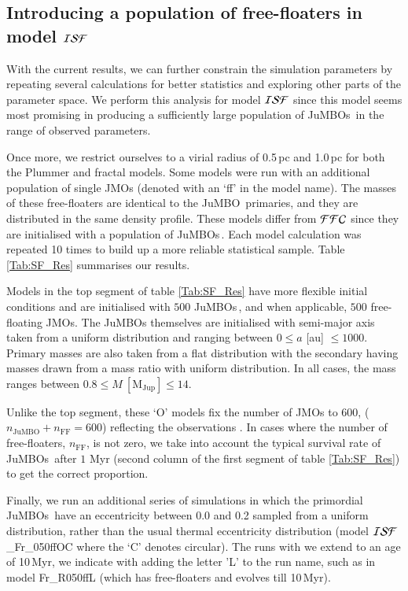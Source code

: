 \documentclass[submission,phys]{lib/SciPost}
\newcommand{\jumbo}{\mbox{JuMBO}}
\newcommand{\jumbos}{\mbox{JuMBOs}}
\begin{document}
\subsection{Introducing a population of free-floaters in model ${\cal ISF}$}\label{sect:ISF_explored}

With the current results, we can further constrain the simulation
parameters by repeating several calculations for better statistics and
exploring other parts of the parameter space.  We perform this
analysis for model ${\cal ISF}$ since this model seems most
promising in producing a sufficiently large population of \jumbos\,
in the range of observed parameters.

Once more, we restrict ourselves to a virial radius of 0.5\,pc and
1.0\,pc for both the Plummer and fractal models. Some models
were run with an additional population of single JMOs (denoted with an 
`ff' in the model name). The masses of these free-floaters are 
identical to the \jumbo\, primaries, and they are distributed in the same 
density profile. These models differ from ${\cal FFC}$ since they are 
initialised with a population of \jumbos\,. Each model calculation was 
repeated 10 times to build up a more reliable statistical sample. 
Table \ref{Tab:SF_Res} summarises our results.

Models in the top segment of table \ref{Tab:SF_Res} have more flexible
initial conditions and are initialised with $500$ \jumbos\,, and when
applicable, $500$ free-floating JMOs. The JuMBOs themselves are
initialised with semi-major axis taken from a uniform distribution and
ranging between $0\leq a$ [au] $\leq 1000$. Primary masses are also
taken from a flat distribution with the secondary having masses drawn
from a mass ratio with uniform distribution. In all cases, the mass
ranges between $0.8\leq M\ [\mathrm{M_{Jup}}]\leq 14$.

Unlike the top segment, these `O' models fix the number of JMOs to
$600$, ($n_{\mathrm{\jumbo}} + n_{\mathrm{FF}} = 600$) reflecting the
observations \cite{2023arXiv231001231P}. In cases where the number of
free-floaters, $n_{\mathrm{FF}}$, is not zero, we take into account
the typical survival rate of \jumbos\ after $1$ Myr (second column of
the first segment of table \ref{Tab:SF_Res}) to get the correct
proportion.

Finally, we run an additional series of simulations in which the
primordial \jumbos\, have an eccentricity between 0.0 and 0.2 sampled
from a uniform distribution, rather than the usual thermal
eccentricity distribution (model ${\cal ISF}$\_Fr\_050ffOC where the `C' denotes
circular).  The runs with we extend to an age of 10\,Myr, we indicate
with adding the letter 'L' to the run name, such as in model
Fr\_R050ffL (which has free-floaters and evolves till 10\,Myr).
\end{document}
